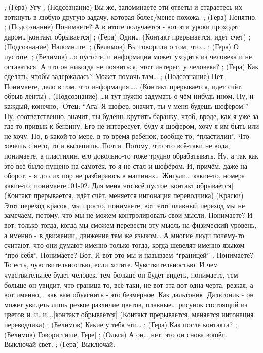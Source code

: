 ;	(Гера) Угу
;	(Подсознание) Вы же, запоминаете эти ответы и стараетесь их воткнуть в любую другую задачу, которая более/менее похожа.
;	(Гера)  Понятно.
;	(Подсознание) Понимаете? А в итоге получается -  вот эти уроки проходят даром…[контакт обрывается]
;	(Гера) Один…
(Контакт прерывается, идет счет)
;	(Подсознание) Напомните.
;	(Белимов) Вы говорили о том, что…
;	(Гера)  О пустоте.
;	(Белимов) ..о пустоте, и информация может уходить из человека и не оставаться. А что он никогда не появиться, этот интерес, у человека?
;	(Гера) Как сделать, чтобы задержалась? Может  помочь там…
;	(Подсознание) Нет. Понимаете, дело в том, что информация….. 
(Контакт прерывается, идет счёт, обрыв ленты)
;	(Подсознание) …и тут нужно задумать о чём-нибудь ином. Ну, и каждый, конечно,-  Отец: ``Ага! Я шофер, значит, ты у меня будешь шофёром!'' Ну, соответственно, значит, ты будешь крутить баранку, чтоб, вроде, как я уже за где-то привык к бензину. Его не интересует, буду я шофером, хочу я им быть или не хочу. Но, в какой-то мере, в то время ребёнок, вообще-то, ``пластилин''. Что хочешь с него, то и вылепишь. Почти. Потому, что это всё-таки не вода, понимаете, а пластилин, его довольно-то тоже трудно обрабатывать. Ну, а так как это всё было пущено на самотёк, то я не стал и шофёром. И, причём, даже на оборот, - я до сих пор не разбираюсь в машинах… Жигули… какие-то, номера какие-то, понимаете…01-02. Для меня это всё пустое.[контакт обрывается]
(Контакт прерывается, идёт счёт, меняется интонация переводчика)
(Краски) Этот переход красок, мы просто, понимаете, вот этот плавный переход мы не замечаем, потому, что мы не можем контролировать свои мысли. Понимаете? И вот, только тогда, когда мы сможем перевести эту мысль на физический уровень, а именно - в движении, движение тем же языком… А многие люди почему-то считают, что они думают именно только тогда, когда шевелят именно языком ``про себя''. Понимаете? Вот.  И вот это мы и называем ``границей'' . Понимаете? То есть, чувствительностью, если хотите. Чувствительностью.  И чем чувствительнее будет человек, тем больше он будет видеть, понимаете, тем больше он увидит, что граница-то, всё-таки, не вот эта вот одна черта, резкая, а вот именно,.. как вам объяснить - это безмерное. Как дальтоник.  Дальтоник - он может увидеть лишь резкое различие цветов, плавные… рисунок состоящий из цветов и..и…и….[контакт обрывается]
(Контакт прерывается, меняется интонация переводчика)
;	(Белимов) Какие у тебя эти…
;	(Гера) Как после контакта?
;	(Белимов) Говори тише.[Гере]
;	(Ольга) А он… нет, это он снова вошёл. Выключай свет. 
;	(Гера) Выключай.
